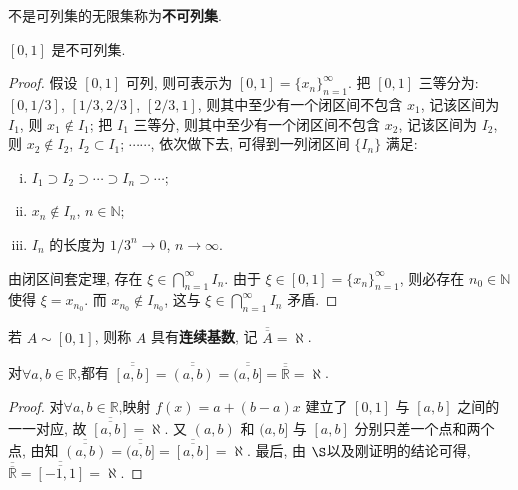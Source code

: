 \documentclass[../../main.tex]{subfiles}
\begin{document}
\begin{definition}[不可列集]
不是可列集的无限集称为\textbf{不可列集}.
\end{definition}

\begin{theorem}
$[0, 1]$ 是不可列集.
\end{theorem}
\begin{proof}
假设 $[0, 1]$ 可列, 则可表示为 $[0, 1] = \{x_n\}_{n = 1}^{\infty}$.
把 $[0, 1]$ 三等分为: $[0, 1/3]$, $[1/3, 2/3]$, $[2/3, 1]$, 则其中至少有一个闭区间不包含 $x_1$, 记该区间为 $I_1$, 则 $x_1 \notin I_1$; 把 $I_1$ 三等分, 则其中至少有一个闭区间不包含 $x_2$, 记该区间为 $I_2$, 则 $x_2 \notin I_2$, $I_2 \subset I_1$; $\cdots\cdots$, 依次做下去, 可得到一列闭区间 $\{I_n\}$ 满足:
\begin{enumerate}[(i)]
\item $I_1 \supset I_2 \supset \cdots \supset I_n \supset \cdots$;
\item $x_n \notin I_n$, $n \in \mathbb{N}$;
\item $I_n$ 的长度为 $1/3^n \to 0$, $n \to \infty$.
\end{enumerate}
由闭区间套定理, 存在 $\xi \in \bigcap_{n = 1}^{\infty} I_n$. 由于 $\xi \in [0, 1] = \{x_n\}_{n = 1}^{\infty}$, 则必存在 $n_0 \in \mathbb{N}$ 使得 $\xi = x_{n_0}$. 而 $x_{n_0} \notin I_{n_0}$, 这与 $\xi \in \bigcap_{n = 1}^{\infty} I_n$ 矛盾. 
\end{proof}

\begin{definition}
若 $A \sim [0, 1]$, 则称 $A$ 具有\textbf{连续基数}, 记 $\overline{\overline{A}} = \aleph$.
\end{definition}

\begin{theorem}
对$\forall a,b\in \mathbb{R}$,都有
$\overline{\overline{[a, b]}} = \overline{\overline{(a, b)}} = \overline{\overline{(a, b]}} = \overline{\overline{\mathbb{R}}} = \aleph$.
\end{theorem}
\begin{proof}
对$\forall a,b\in \mathbb{R}$,映射 $f(x) = a + (b - a)x$ 建立了 $[0, 1]$ 与 $[a, b]$ 之间的一一对应, 故 $\overline{\overline{[a, b]}} = \aleph$. 又 $(a, b)$ 和 $(a, b]$ 与 $[a, b]$ 分别只差一个点和两个点, 由知 $\overline{\overline{(a, b)}} = \overline{\overline{(a, b]}} = \overline{\overline{[a, b]}} = \aleph$. 最后, 由 $\S$以及刚证明的结论可得, $\overline{\overline{\mathbb{R}}} = \overline{\overline{[-1, 1]}} = \aleph$.
\end{proof}
\end{document}
